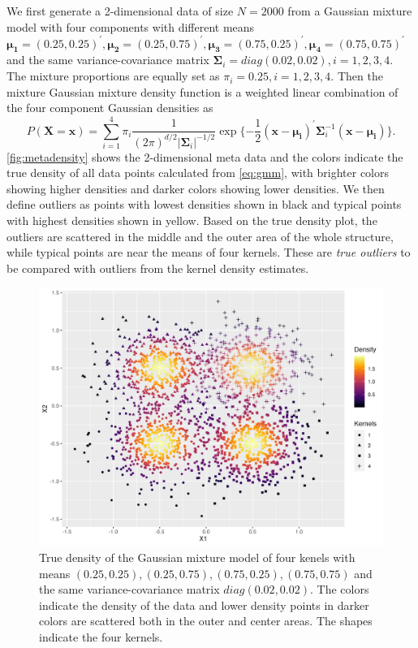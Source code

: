 \documentclass[11pt,a4paper,]{article}
\begin{document}
We first generate a 2-dimensional data of size \(N=2000\) from a Gaussian mixture model with four components with different means \(\pmb{\mu_1}=(0.25, 0.25)^\prime, \pmb{\mu_2}=(0.25, 0.75)^\prime, \pmb{\mu_3}=(0.75, 0.25)^\prime, \pmb{\mu_4}=(0.75, 0.75)^\prime\) and the same variance-covariance matrix \(\pmb{\Sigma}_i=diag(0.02, 0.02), i=1,2,3,4\). The mixture proportions are equally set as \(\pi_i=0.25, i=1,2,3,4\).
Then the mixture Gaussian mixture density function is a weighted linear combination of the four component Gaussian densities as
\begin{equation}
\label{eq:gmm}
P(\pmb{X}=\pmb{x}) = \sum_{i=1}^{4}\pi_i \frac{1}{(2\pi)^{d/2}|\pmb{\Sigma}_i|^{-1/2}} \exp{\{-\frac{1}{2} (\pmb{x}-\pmb{\mu_i})^\prime \pmb{\Sigma}_i^{-1} (\pmb{x}-\pmb{\mu_i}) \}}.
\end{equation}
\autoref{fig:metadensity} shows the 2-dimensional meta data and the colors indicate the true density of all data points calculated from \eqref{eq:gmm}, with brighter colors showing higher densities and darker colors showing lower densities. We then define outliers as points with lowest densities shown in black and typical points with highest densities shown in yellow. Based on the true density plot, the outliers are scattered in the middle and the outer area of the whole structure, while typical points are near the means of four kernels. These are \emph{true outliers} to be compared with outliers from the kernel density estimates.

\begin{figure}

{\centering \includegraphics[width=0.8\linewidth]{figures/truedensity_4kernels} 

}

\caption{True density of the Gaussian mixture model of four kenels with means $(0.25, 0.25), (0.25, 0.75), (0.75, 0.25), (0.75, 0.75)$ and the same variance-covariance matrix $diag(0.02, 0.02)$. The colors indicate the density of the data and lower density points in darker colors are scattered both in the outer and center areas. The shapes indicate the four kernels.}\label{fig:metadensity}
\end{figure}
\end{document}
